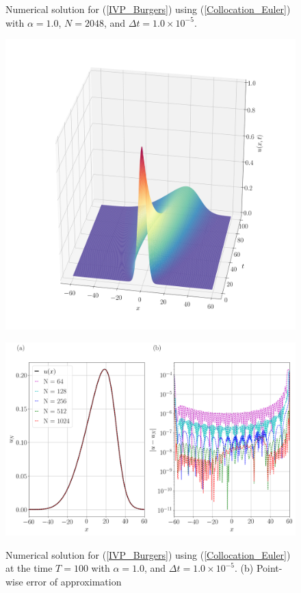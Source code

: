 	\newpage
	\begin{figure}[H]
		\centering
		\caption{Numerical solution for (\ref{IVP_Burgers}) using (\ref{Collocation_Euler}) with $\alpha = 1.0$, $N=2048$, and $\Delta t = 1.0 \times 10^{-5}$.}
		\includegraphics[width=12cm]{burgers_equation/deterministic/numerical_experiments/viscid/figures/collocation/Numerical_Solution_alpha=1.png}
		\label{Collocation_alpha=1}
		\caption{Numerical solution for (\ref{IVP_Burgers}) using (\ref{Collocation_Euler}) at the time $T = 100$ with $\alpha = 1.0$, and $\Delta t = 1.0 \times 10^{-5}$. (b) Point-wise error of approximation}
		\includegraphics[width=12.5cm]{burgers_equation/deterministic/numerical_experiments/viscid/figures/collocation/Numerical_Solution_alpha=1_T=100.png}
		\label{Collocation_alpha=1_T}
	\end{figure}
